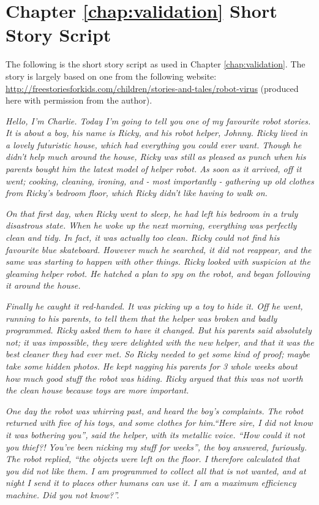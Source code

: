 \cleartooddpage
\chapter{Chapter \ref{chap:validation} Short Story Script} \label{app:story}
The following is the short story script as used in Chapter \ref{chap:validation}. The story is largely based on one from the following website: \href{http://freestoriesforkids.com/children/stories-and-tales/robot-virus}{http://freestoriesforkids.com/children/stories-and-tales/robot-virus} (produced here with permission from the author).

\textit{Hello, I'm Charlie. Today I'm going to tell you one of my favourite robot stories. It is about a boy, his name is Ricky, and his robot helper, Johnny. Ricky lived in a lovely futuristic house, which had everything you could ever want. Though he didn't help much around the house, Ricky was still as pleased as punch when his parents bought him the latest model of helper robot. As soon as it arrived, off it went; cooking, cleaning, ironing, and - most importantly - gathering up old clothes from Ricky's bedroom floor, which Ricky didn't like having to walk on.}

\textit{On that first day, when Ricky went to sleep, he had left his bedroom in a truly disastrous state. When he woke up the next morning, everything was perfectly clean and tidy. In fact, it was actually too clean. Ricky could not find his favourite blue skateboard. However much he searched, it did not reappear, and the same was starting to happen with other things. Ricky looked with suspicion at the gleaming helper robot. He hatched a plan to spy on the robot, and began following it around the house. }

\textit{Finally he caught it red-handed. It was picking up a toy to hide it. Off he went, running to his parents, to tell them that the helper was broken and badly programmed. Ricky asked them to have it changed. But his parents said absolutely not; it was impossible, they were delighted with the new helper, and that it was the best cleaner they had ever met. So Ricky needed to get some kind of proof; maybe take some hidden photos. He kept nagging his parents for 3 whole weeks about how much good stuff the robot was hiding. Ricky argued that this was not worth the clean house because toys are more important.}

\textit{One day the robot was whirring past, and heard the boy's complaints. The robot returned with five of his toys, and some clothes for him.``Here sire, I did not know it was bothering you'', said the helper, with its metallic voice. ``How could it not you thief?! You've been nicking my stuff for weeks'', the boy answered, furiously. The robot replied, ``the objects were left on the floor. I therefore calculated that you did  not like them. I am programmed to collect all that is not wanted, and at night I send it to places other humans can use it. I am a maximum efficiency machine. Did you not know?''.}

